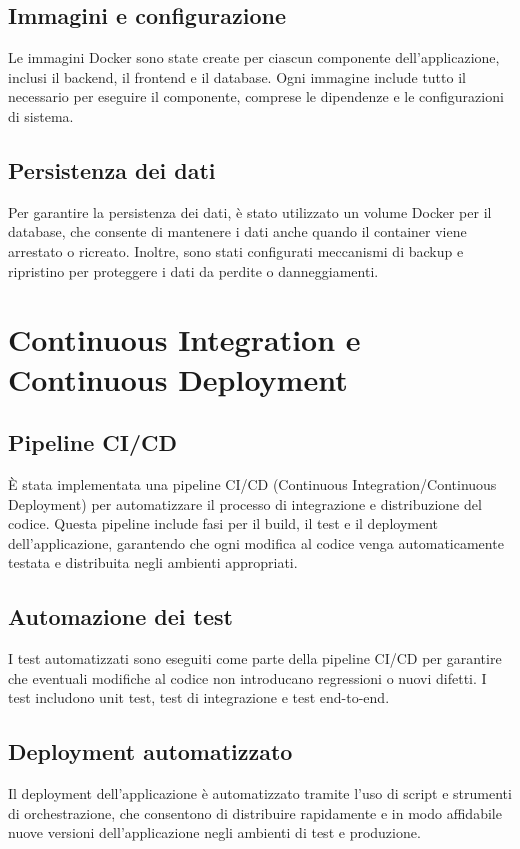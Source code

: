 \documentclass[12pt,a4paper,oneside]{report}
\begin{document}
\subsection{Immagini e configurazione}
Le immagini Docker sono state create per ciascun componente dell'applicazione, inclusi il backend, il frontend e il database. Ogni immagine include tutto il necessario per eseguire il componente, comprese le dipendenze e le configurazioni di sistema.

\subsection{Persistenza dei dati}
Per garantire la persistenza dei dati, è stato utilizzato un volume Docker per il database, che consente di mantenere i dati anche quando il container viene arrestato o ricreato. Inoltre, sono stati configurati meccanismi di backup e ripristino per proteggere i dati da perdite o danneggiamenti.

\section{Continuous Integration e Continuous Deployment}
\subsection{Pipeline CI/CD}
È stata implementata una pipeline CI/CD (Continuous Integration/Continuous Deployment) per automatizzare il processo di integrazione e distribuzione del codice. Questa pipeline include fasi per il build, il test e il deployment dell'applicazione, garantendo che ogni modifica al codice venga automaticamente testata e distribuita negli ambienti appropriati.

\subsection{Automazione dei test}
I test automatizzati sono eseguiti come parte della pipeline CI/CD per garantire che eventuali modifiche al codice non introducano regressioni o nuovi difetti. I test includono unit test, test di integrazione e test end-to-end.

\subsection{Deployment automatizzato}
Il deployment dell'applicazione è automatizzato tramite l'uso di script e strumenti di orchestrazione, che consentono di distribuire rapidamente e in modo affidabile nuove versioni dell'applicazione negli ambienti di test e produzione.
\end{document}

